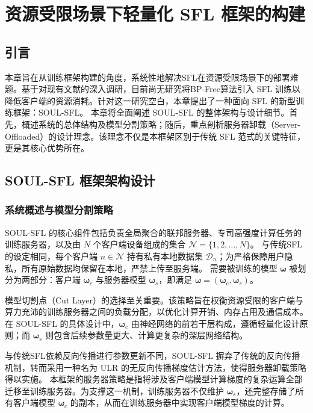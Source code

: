 
\chapter{资源受限场景下轻量化 SFL 框架的构建}
\section{引言}
本章旨在从训练框架构建的角度，系统性地解决SFL在资源受限场景下的部署难题。基于对现有文献的深入调研，目前尚无研究将BP-Free算法引入 SFL 训练以降低客户端的资源消耗。针对这一研究空白，本章提出了一种面向 SFL 的新型训练框架：SOUL-SFL。
本章将全面阐述 SOUL-SFL 的整体架构与设计细节。首先，概述系统的总体结构及模型分割策略；随后，重点剖析服务器卸载（Server-Offloaded）的设计理念。该理念不仅是本框架区别于传统 SFL 范式的关键特征，更是其核心优势所在。


\section{SOUL-SFL 框架架构设计}
\label{sec:architecture}

\subsection{系统概述与模型分割策略}
\label{subsec:overview}

SOUL-SFL 的核心组件包括负责全局聚合的联邦服务器、专司高强度计算任务的训练服务器，以及由 $N$ 个客户端设备组成的集合 $\mathcal{N} = \{1, 2, \dots, N\}$。
与传统SFL的设定相同，每个客户端 $n \in \mathcal{N}$ 持有私有本地数据集 $\mathcal{D}_n$；为严格保障用户隐私，所有原始数据均保留在本地，严禁上传至服务端。
需要被训练的模型 $\boldsymbol{\omega}$ 被划分为两部分：客户端 $\boldsymbol{\omega}_c$ 与服务器模型 $\boldsymbol{\omega}_s$，即满足 $\boldsymbol{\omega} = (\boldsymbol{\omega}_c, \boldsymbol{\omega}_s)$。

模型切割点（Cut Layer）的选择至关重要。该策略旨在权衡资源受限的客户端与算力充沛的训练服务器之间的负载分配，以优化计算开销、内存占用及通信成本。在 SOUL-SFL 的具体设计中，$\boldsymbol{\omega}_c$ 由神经网络的前若干层构成，遵循轻量化设计原则；而 $\boldsymbol{\omega}_s$ 则包含后续参数量更大、计算更复杂的深层网络结构。

与传统SFL依赖反向传播进行参数更新不同，SOUL-SFL 摒弃了传统的反向传播机制，转而采用一种名为 ULR 的无反向传播梯度估计方法，使得服务器卸载策略得以实施。
本框架的服务器策略是指将涉及客户端模型计算梯度的复杂运算全部迁移至训练服务器。为支撑这一机制，训练服务器不仅维护 $\boldsymbol{\omega}_s$，还完整存储了所有客户端模型 $\boldsymbol{\omega}_c$ 的副本，从而在训练服务器中实现客户端模型梯度的计算。
